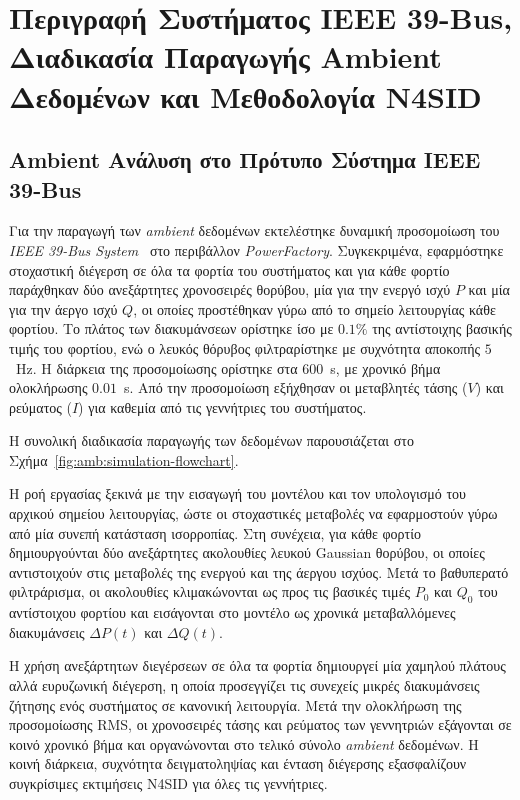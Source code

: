 \chapter{Περιγραφή Συστήματος IEEE 39-Bus, Διαδικασία Παραγωγής Ambient Δεδομένων και Μεθοδολογία N4SID}

\section{Ambient Ανάλυση στο Πρότυπο Σύστημα ΙΕΕΕ 39-Bus}

Για την παραγωγή των \textenglish{\textit{ambient}} δεδομένων εκτελέστηκε δυναμική προσομοίωση του \textenglish{\textit{IEEE 39-Bus System}}~\cite{digsilent39} στο περιβάλλον \textenglish{\textit{PowerFactory}}. Συγκεκριμένα, εφαρμόστηκε στοχαστική διέγερση σε όλα τα φορτία του συστήματος και για κάθε φορτίο παράχθηκαν δύο ανεξάρτητες χρονοσειρές θορύβου, μία για την ενεργό ισχύ $P$ και μία για την άεργο ισχύ $Q$, οι οποίες προστέθηκαν γύρω από το σημείο λειτουργίας κάθε φορτίου. Το πλάτος των διακυμάνσεων ορίστηκε ίσο με $0.1\%$ της αντίστοιχης βασικής τιμής του φορτίου, ενώ ο λευκός θόρυβος φιλτραρίστηκε με συχνότητα αποκοπής $5$~Hz. Η διάρκεια της προσομοίωσης ορίστηκε στα $600$~s, με χρονικό βήμα ολοκλήρωσης $0.01$~s. Από την προσομοίωση εξήχθησαν οι μεταβλητές τάσης ($V$) και ρεύματος ($I$) για καθεμία από τις γεννήτριες του συστήματος.

Η συνολική διαδικασία παραγωγής των δεδομένων παρουσιάζεται στο Σχήμα~\ref{fig:amb:simulation-flowchart}.

Η ροή εργασίας ξεκινά με την εισαγωγή του μοντέλου και τον υπολογισμό του αρχικού σημείου λειτουργίας, ώστε οι στοχαστικές μεταβολές να εφαρμοστούν γύρω από μία συνεπή κατάσταση ισορροπίας. Στη συνέχεια, για κάθε φορτίο δημιουργούνται δύο ανεξάρτητες ακολουθίες λευκού Gaussian θορύβου, οι οποίες αντιστοιχούν στις μεταβολές της ενεργού και της άεργου ισχύος. Μετά το βαθυπερατό φιλτράρισμα, οι ακολουθίες κλιμακώνονται ως προς τις βασικές τιμές $P_0$ και $Q_0$ του αντίστοιχου φορτίου και εισάγονται στο μοντέλο ως χρονικά μεταβαλλόμενες διακυμάνσεις $\Delta P(t)$ και $\Delta Q(t)$.

Η χρήση ανεξάρτητων διεγέρσεων σε όλα τα φορτία δημιουργεί μία χαμηλού πλάτους αλλά ευρυζωνική διέγερση, η οποία προσεγγίζει τις συνεχείς μικρές διακυμάνσεις ζήτησης ενός συστήματος σε κανονική λειτουργία. Μετά την ολοκλήρωση της προσομοίωσης RMS, οι χρονοσειρές τάσης και ρεύματος των γεννητριών εξάγονται σε κοινό χρονικό βήμα και οργανώνονται στο τελικό σύνολο \textenglish{\textit{ambient}} δεδομένων. Η κοινή διάρκεια, συχνότητα δειγματοληψίας και ένταση διέγερσης εξασφαλίζουν συγκρίσιμες εκτιμήσεις N4SID για όλες τις γεννήτριες.

